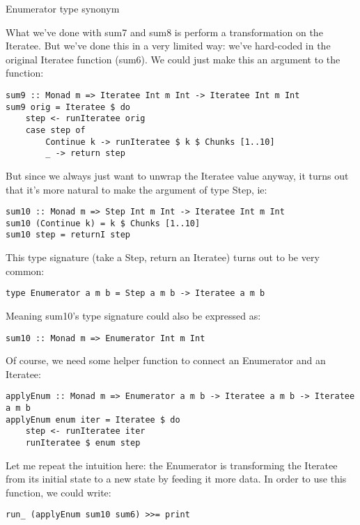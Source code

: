 Enumerator type synonym

What we've done with sum7 and sum8 is perform a transformation on the Iteratee. But we've done this in a very limited way: we've hard-coded in the original Iteratee function (sum6). We could just make this an argument to the function:

\begin{lstlisting}
sum9 :: Monad m => Iteratee Int m Int -> Iteratee Int m Int
sum9 orig = Iteratee $ do
    step <- runIteratee orig
    case step of
        Continue k -> runIteratee $ k $ Chunks [1..10]
        _ -> return step
\end{lstlisting}

But since we always just want to unwrap the Iteratee value anyway, it turns out that it's more natural to make the argument of type Step, ie:

\begin{lstlisting}
sum10 :: Monad m => Step Int m Int -> Iteratee Int m Int
sum10 (Continue k) = k $ Chunks [1..10]
sum10 step = returnI step
\end{lstlisting}

This type signature (take a Step, return an Iteratee) turns out to be very common:

\begin{lstlisting}
type Enumerator a m b = Step a m b -> Iteratee a m b
\end{lstlisting}

Meaning sum10's type signature could also be expressed as:

\begin{lstlisting}
sum10 :: Monad m => Enumerator Int m Int
\end{lstlisting}

Of course, we need some helper function to connect an Enumerator and an Iteratee:

\begin{lstlisting}
applyEnum :: Monad m => Enumerator a m b -> Iteratee a m b -> Iteratee a m b
applyEnum enum iter = Iteratee $ do
    step <- runIteratee iter
    runIteratee $ enum step
\end{lstlisting}

Let me repeat the intuition here: the Enumerator is transforming the Iteratee from its initial state to a new state by feeding it more data. In order to use this function, we could write:

\begin{lstlisting}
run_ (applyEnum sum10 sum6) >>= print
\end{lstlisting}

